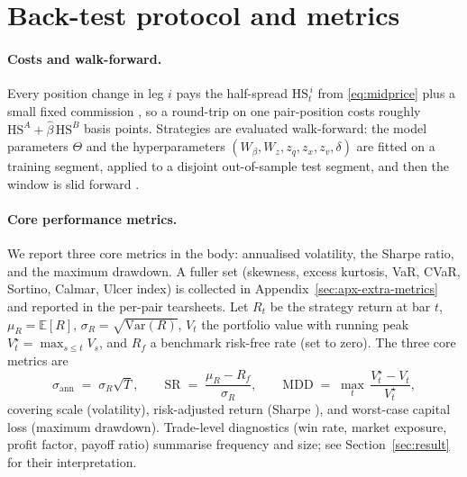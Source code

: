 
\section{Back-test protocol and metrics}\label{sec:backtest}

\paragraph{Costs and walk-forward.}\label{sec:walkforward}
Every position change in leg $i$ pays the half-spread $\mathrm{HS}_t^{\,i}$ from \eqref{eq:midprice} plus a small fixed commission \parencite{aldridge2013hft}, so a round-trip on one pair-position costs roughly $\mathrm{HS}^{A} + \hat\beta\,\mathrm{HS}^{B}$ basis points. Strategies are evaluated walk-forward: the model parameters $\Theta$ and the hyperparameters $(W_\beta, W_z, z_q, z_x, z_v, \delta)$ are fitted on a training segment, applied to a disjoint out-of-sample test segment, and then the window is slid forward \parencite{lopezdeprado2018advances}.

\paragraph{Core performance metrics.}\label{sec:metrics}
We report three core metrics in the body: annualised volatility, the Sharpe ratio, and the maximum drawdown. A fuller set (skewness, excess kurtosis, VaR, CVaR, Sortino, Calmar, Ulcer index) is collected in Appendix~\ref{sec:apx-extra-metrics} and reported in the per-pair tearsheets. Let $R_t$ be the strategy return at bar $t$, $\mu_R = \mathbb{E}[R]$, $\sigma_R = \sqrt{\mathrm{Var}(R)}$, $V_t$ the portfolio value with running peak $V_t^{\star} = \max_{s \leq t} V_s$, and $R_f$ a benchmark risk-free rate (set to zero). The three core metrics are
\begin{equation}\label{eq:coremetrics}
    \sigma_{\mathrm{ann}} \;=\; \sigma_R\sqrt{T},
    \qquad
    \mathrm{SR} \;=\; \frac{\mu_R - R_f}{\sigma_R},
    \qquad
    \mathrm{MDD} \;=\; \max_{t}\,\frac{V_t^{\star} - V_t}{V_t^{\star}},
\end{equation}
covering scale (volatility), risk-adjusted return (Sharpe \parencite{sharpe1994ratio}), and worst-case capital loss (maximum drawdown). Trade-level diagnostics (win rate, market exposure, profit factor, payoff ratio) summarise frequency and size; see Section~\ref{sec:result} for their interpretation.
